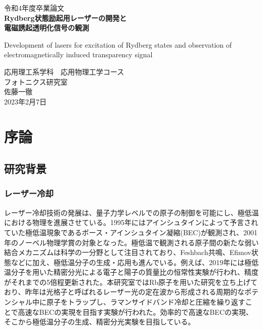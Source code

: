 \documentclass[dvipdfmx]{jsarticle}
\begin{document}
\begin{titlepage}
   \begin{center}
       \vspace*{2cm}

       \huge
       令和4年度卒業論文\\
       \vspace{0.5cm}
       \textbf{Rydberg状態励起用レーザーの開発と\\電磁誘起透明化信号の観測}
       
       \vspace{0.5cm}
       \LARGE
        Development of lasers for excitation of Rydberg states and observation of electromagnetically induced transparency signal

       \large
       \vspace{2cm}
       応用理工系学科　応用物理工学コース \\
       
       \vspace{1cm}
       フォトニクス研究室 \\
       
    \vspace{1cm}
       佐藤一徹 \\
            
       \vspace{1cm}
       2023年2月7日            
   \end{center}
\end{titlepage}

\setcounter{tocdepth}{3}
\tableofcontents

\clearpage
\section{序論}
\subsection{研究背景}
\subsubsection{レーザー冷却}
レーザー冷却技術の発展は、量子力学レベルでの原子の制御を可能にし、極低温における物理を進展させている。1995年にはアインシュタインによって予言されていた極低温現象であるボース・アインシュタイン凝縮(BEC)が観測され、2001年のノーベル物理学賞の対象となった。\cite{bose}極低温で観測される原子間の新たな弱い結合メカニズムは科学の一分野として注目されており、Feshbach共鳴\cite{fesh}、Efimov状態\cite{efimov}などに加え、極低温分子の生成・応用も進んでいる。例えば、2019年には極低温分子を用いた精密分光による電子と陽子の質量比の恒常性実験が行われ、精度がそれまでの5倍程更新された。\cite{kobayashi}本研究室ではRb原子を用いた研究を立ち上げており、昨年は光格子と呼ばれるレーザー光の定在波から形成される周期的なポテンシャル中に原子をトラップし、ラマンサイドバンド冷却と圧縮を繰り返すことで高速なBECの実現を目指す実験が行われた。\cite{okuda}効率的で高速なBECの実現、そこから極低温分子の生成、精密分光実験を目指している。
\end{document}

